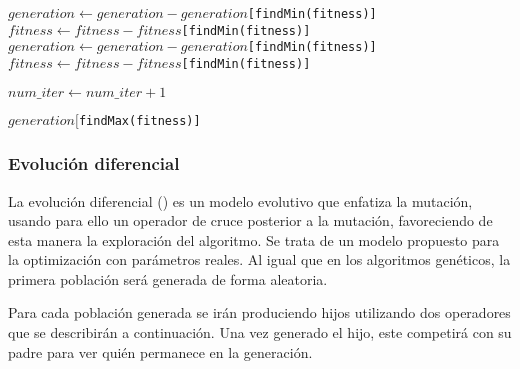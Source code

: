 \begin{algorithm}[H]
\begin{algorithmic}[1]
		\State $generation \gets generation - generation$\texttt{[findMin(fitness)]}
		\State $fitness \gets fitness - fitness$\texttt{[findMin(fitness)]}
		\State $generation \gets generation - generation$\texttt{[findMin(fitness)]}
		\State $fitness \gets fitness - fitness$\texttt{[findMin(fitness)]}
		
		\vspace{0.2cm}	
		
		\State $num\_iter \gets num\_iter + 1$			
		
		\EndWhile		
		
		\vspace{0.2cm}	
		
		\Return $generation[$\texttt{findMax(fitness)]}
		
		\EndProcedure
	\end{algorithmic}
\end{algorithm}

\subsubsection{Evolución diferencial}

	La evolución diferencial (\cite{differentialevo}) es un modelo evolutivo que enfatiza la mutación, usando para ello un operador de cruce posterior a la mutación, favoreciendo de esta manera la exploración del algoritmo. Se trata de un modelo propuesto para la optimización con parámetros reales. Al igual que en los algoritmos genéticos, la primera población será generada de forma aleatoria.
	
	Para cada población generada se irán produciendo hijos utilizando dos operadores que se describirán a continuación. Una vez generado el hijo, este competirá con su padre para ver quién permanece en la generación.

